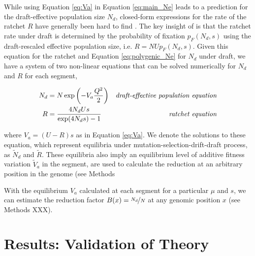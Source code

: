 \documentclass[11pt]{article}
\begin{document}

While using Equation \eqref{eq:Va} in Equation \eqref{eq:main_Ne} leads to a
prediction for the draft-effective population size $N_d$, closed-form
expressions for the rate of the ratchet $R$ have generally been hard to find
\parencite{Haigh1978-gt,Higgs1995-xc,Gessler1995-hz}. The key insight of
\textcite{Santiago2016-mu} is that the ratchet rate under draft is determined
by the probability of fixation $p_F(N_d, s)$
\parencite{Kimura1962-su,Malecot1952-qh} using the draft-rescaled effective
population size, i.e. $R = N U p_F(N_d, s)$. Given this equation for the
ratchet and Equation \eqref{eq:polygenic_Ne} for $N_d$ under draft, we have a
system of two non-linear equations that can be solved numerically for $N_d$ and
$R$ for each segment,

\begin{align}
  \label{eq:main_eqns}
  N_d &= N \exp \left( -V_a \frac{Q^2}{2} \right) & \text{\emph{draft-effective population equation}} \\
  R &= \frac{4N_d U s}{\exp(4 N_d s)-1}  & \text{\emph{ratchet equation}}
\end{align}

where $V_a = (U-R)s$ as in Equation \eqref{eq:Va}. We denote the solutions to
these equation, which represent equilibria under mutation-selection-drift-draft
process, as $\widetilde{N}_d$ and $\widetilde{R}$. These equilibria also imply
an equilibrium level of additive fitness variation $\widetilde{V}_a$ in the
segment, are used to calculate the reduction at an arbitrary position in the
genome (see Methods 

With the equilibrium $V_a$ calculated at each segment for a particular $\mu$
and $s$, we can estimate the reduction factor $B(x) = \nicefrac{N_d}{N}$ at any
genomic position $x$ (see Methods XXX).

\section*{Results: Validation of Theory}
\end{document}
